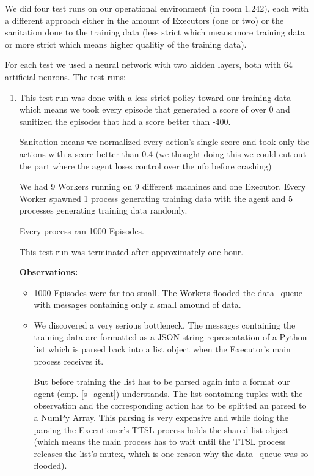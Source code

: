 We did four test runs on our operational environment (in
room 1.242), each with a different approach either in the
amount of Executors (one or two) or the sanitation done
to the training data (less strict which means more training
data or more strict which means higher qualitiy of the
training data).

For each test we used a neural network with two hidden
layers, both with 64 artificial neurons.
\newline\newline
The test runs:
\begin{enumerate}

  \item This test run was done with a less strict policy
        toward our training data which means we took every
        episode that generated a score of over 0 and
        sanitized the episodes that had a score better than
        -400.

        Sanitation means we normalized every action's
        single score and took only the actions with a score
        better than 0.4 (we thought doing this we could
        cut out the part where the agent loses control over
        the ufo before crashing)

        We had 9 Workers running on 9 different machines
        and one Executor. Every Worker spawned 1 process
        generating training data with the agent and 5
        processes generating training data randomly.

        Every process ran 1000 Episodes.

        This test run was terminated after approximately
        one hour.

        \textbf{Observations:}

        \begin{itemize}

          \item 1000 Episodes were far too small. The
                Workers flooded the data\_queue with
                messages containing only a small amound of
                data.

          \item We discovered a very serious bottleneck.
                The messages containing the training data
                are formatted as a JSON string
                representation of a Python list which is
                parsed back into a list object when the
                Executor's main process receives it.

                But before training the list has to be
                parsed again into a format our agent (cmp.
                \ref{s_agent}) understands. The list
                containing tuples with the observation and
                the corresponding action has to be splitted
                an parsed to a NumPy Array. This parsing is
                very expensive and while doing the parsing
                the Executioner's TTSL process holds the
                shared list object (which means the main
                process has to wait until the TTSL process
                releases the list's mutex, which is one
                reason why the data\_queue was so flooded).


\end{itemize}
\end{enumerate}
